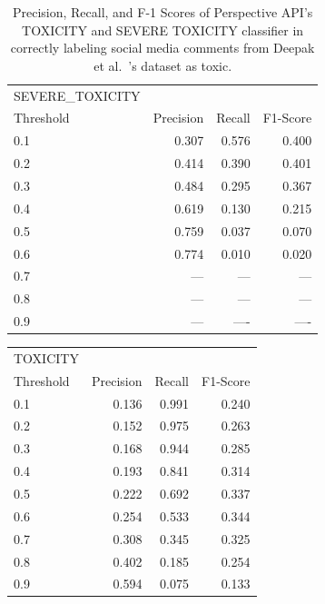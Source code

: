 \begin{table}[t]
\centering
\small
\begin{tabular}{lrrr}
\toprule
   SEVERE\_TOXICITY \\
   Threshold &   Precision &  Recall  &    F1-Score  \\ \midrule
      0.1  &0.307& 0.576 & 0.400\\
      0.2 &0.414 & 0.390 &0.401 \\
      0.3& 0.484 & 0.295 & 0.367 \\
      0.4 & 0.619 &  0.130 & 0.215 \\
      0.5 & 0.759 & 0.037 & 0.070\\
      0.6 & 0.774 & 0.010 &0.020\\
      0.7 & --- & --- & ---\\
      0.8 & --- & --- &---\\
      0.9 & --- &----& ----\\
\end{tabular}
\caption{Precision, Recall, and F-1 Scores of Perspective API's TOXICITY and SEVERE TOXICITY classifier in correctly labeling social media comments from Deepak et al.~\cite{kumar2021designing}'s dataset as toxic. }
\label{tbl:ergm}
\end{table}

\begin{tabular}{lrrr}
\toprule
TOXICITY \\
    Threshold &   Precision &  Recall  &    F1-Score  \\         \midrule
      0.1  &0.136& 0.991 & 0.240\\
      0.2 &0.152 & 0.975 &0.263 \\
      0.3&0.168 & 0.944 & 0.285 \\
      0.4 & 0.193&  0.841 & 0.314 \\
      0.5 & 0.222 & 0.692 & 0.337\\
      0.6 & 0.254 & 0.533 &0.344\\
      0.7 & 0.308 & 0.345 & 0.325\\
      0.8 & 0.402 & 0.185 &0.254\\
      0.9 & 0.594 &0.075& 0.133\\
      
\end{tabular}

